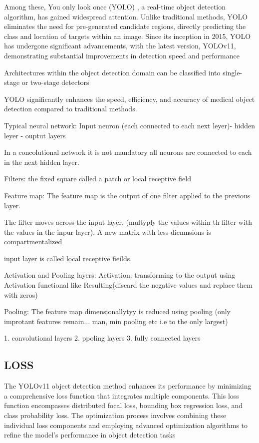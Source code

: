 \documentclass[a4paper,10pt,twocolumn]{article}
\numberwithin{figure}{section}
\numberwithin{table}{section}
\begin{document}
Among these, You only
look once (YOLO) , a real-time object detection algorithm,
has gained widespread attention. Unlike traditional methods,
YOLO eliminates the need for pre-generated candidate regions, directly predicting the class and location of targets
within an image. Since its inception in 2015, YOLO has
undergone significant advancements, with the latest version,
YOLOv11, demonstrating substantial improvements in 
detection speed and performance


Architectures within the object detection domain can be 
classified into single-stage or two-stage detectors

YOLO significantly enhances the speed, efficiency, and accuracy of medical object detection compared to traditional methods.

Typical neural network:
Input neuron (each connected to each next leyer)- hidden leyer - ouptut layers

In a concolutional network it is not mandatory all neurons are connected
to each in the next hidden layer. 

Filters: the fixed square called a patch or local receptive field

Feature map: The feature map is the output of one filter applied 
to the previous layer. 

The filter moves across the input layer. (multyply the values within th 
filter with the values in the inpur layer). A new matrix with less diemnsions is compartmentalized

input layer is called local receptive fieilds. 


Activation and Pooling layers:
Activation: transforming to the output using Activation functional like Resulting(discard the negative
values and replace them with zeros) 

Pooling: The feature map dimensionallytyy is reduced using pooling 
(only improtant features remain... man, min pooling etc i.e  to the only largest)

1. convolutional layers 
2. ppoling layers
3. fully connected layers

\subsection{\mbox{LOSS}}

The YOLOv11 object detection method enhances its performance by minimizing a comprehensive loss function that integrates multiple components. This loss function encompasses
distributed focal loss, bounding box regression loss, and class
probability loss. The optimization process involves combining
these individual loss components and employing advanced
optimization algorithms to refine the model’s performance
in object detection tasks
\end{document}
